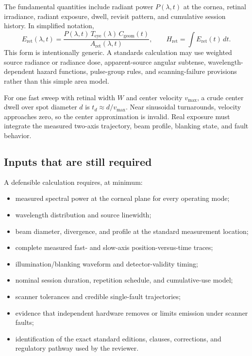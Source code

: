 \documentclass[11pt]{article}
\begin{document}
The fundamental quantities include radiant power $P(\lambda,t)$ at the cornea, retinal irradiance,
radiant exposure, dwell, revisit pattern, and cumulative session history. In simplified notation,
\[
  E_{\mathrm{ret}}(\lambda,t)=
  \frac{P(\lambda,t)\,T_{\mathrm{eye}}(\lambda)\,C_{\mathrm{geom}}(t)}
       {A_{\mathrm{ret}}(\lambda,t)},
\qquad
  H_{\mathrm{ret}}=\int E_{\mathrm{ret}}(t)\,dt .
\]
This form is intentionally generic. A standards calculation may use weighted source radiance or
radiance dose, apparent-source angular subtense, wavelength-dependent hazard functions, pulse-group
rules, and scanning-failure provisions rather than this simple area model.

For one fast sweep with retinal width $W$ and center velocity $v_{\max}$, a crude center dwell over
spot diameter $d$ is $t_d\approx d/v_{\max}$. Near sinusoidal turnarounds, velocity approaches zero,
so the center approximation is invalid. Real exposure must integrate the measured two-axis
trajectory, beam profile, blanking state, and fault behavior.

\subsection{Inputs that are still required}

A defensible calculation requires, at minimum:
\begin{itemize}
  \item measured spectral power at the corneal plane for every operating mode;
  \item wavelength distribution and source linewidth;
  \item beam diameter, divergence, and profile at the standard measurement location;
  \item complete measured fast- and slow-axis position-versus-time traces;
  \item illumination/blanking waveform and detector-validity timing;
  \item nominal session duration, repetition schedule, and cumulative-use model;
  \item scanner tolerances and credible single-fault trajectories;
  \item evidence that independent hardware removes or limits emission under scanner faults;
  \item identification of the exact standard editions, clauses, corrections, and regulatory
  pathway used by the reviewer.
\end{itemize}
\end{document}
